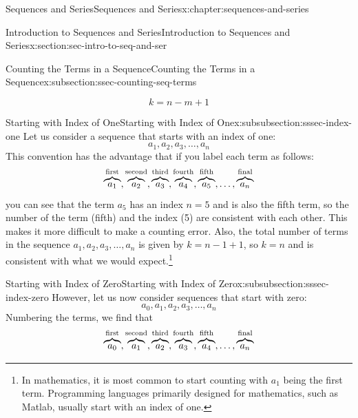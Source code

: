 \documentclass[twoside,10pt,]{book}
\numberwithin{equation}{section}
\begin{document}
\begin{chapterptx}{Sequences and Series}{}{Sequences and Series}{}{}{x:chapter:sequences-and-series}
\begin{sectionptx}{Introduction to Sequences and Series}{}{Introduction to Sequences and Series}{}{}{x:section:sec-intro-to-seq-and-ser}
\begin{subsectionptx}{Counting the Terms in a Sequence}{}{Counting the Terms in a Sequence}{}{}{x:subsection:ssec-counting-seq-terms}
\begin{introduction}{}
\begin{equation*}
k=n-m+1
\end{equation*}
\end{introduction}%
%
%
\typeout{************************************************}
\typeout{************************************************}
%
\begin{subsubsectionptx}{Starting with Index of One}{}{Starting with Index of One}{}{}{x:subsubsection:sssec-index-one}
Let us consider a sequence that starts with an index of one:%
\begin{equation*}
a_1, a_2, a_3, \ldots, a_n
\end{equation*}
This convention has the advantage that if you label each term as follows:%
\begin{equation*}
\overbrace {{a_1}}^{{\rm{first}}},\overbrace {{a_2}}^{{\rm{second}}},\overbrace {{a_3}}^{{\rm{third}}},\overbrace {{a_4}}^{{\rm{fourth}}},\overbrace {{a_5}}^{{\rm{fifth}}}, \ldots ,\overbrace {{a_n}}^{{\rm{final}}}
\end{equation*}
you can see that the term \(a_5\) has an index \(n=5\) and is also the fifth term, so the number of the term (fifth) and the index (5) are consistent with each other.  This makes it more difficult to make a counting error.  Also, the total number of terms in the sequence \(a_1, a_2, a_3, \ldots, a_n\) is given by \(k = n - 1 + 1\), so \(k = n\) and is consistent with what we would expect.\footnote{In mathematics, it is most common to start counting with \(a_1\) being the first term.  Programming languages primarily designed for mathematics, such as Matlab, usually start with an index of one.\label{g:fn:idp29582680}}%
\end{subsubsectionptx}
%
%
\typeout{************************************************}
\typeout{************************************************}
%
\begin{subsubsectionptx}{Starting with Index of Zero}{}{Starting with Index of Zero}{}{}{x:subsubsection:sssec-index-zero}
However, let us now consider sequences that start with zero:%
\begin{equation*}
a_0, a_1, a_2, a_3, \ldots, a_n
\end{equation*}
Numbering the terms, we find that%
\begin{equation*}
\overbrace {{a_0}}^{{\rm{first}}},\overbrace {{a_1}}^{{\rm{second}}},\overbrace {{a_2}}^{{\rm{third}}},\overbrace {{a_3}}^{{\rm{fourth}}},\overbrace {{a_4}}^{{\rm{fifth}}}, \ldots ,\overbrace {{a_n}}^{{\rm{final}}}

\end{equation*}
\end{subsubsectionptx}
\end{subsectionptx}
\end{sectionptx}
\end{chapterptx}
\end{document}
